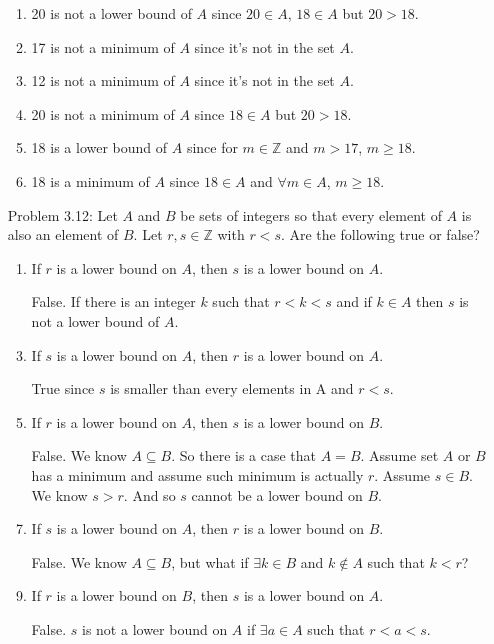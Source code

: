 \documentclass{article}
\theoremstyle{claim}
\theoremstyle{definition}
\begin{document}
\begin{enumerate}
\begin{enumerate}
            \item 20 is not a lower bound of $A$ since $20 \in A$, $18 \in A$ but $20 > 18$.
            \item 17 is not a minimum of $A$ since it's not in the set $A$.
            \item 12 is not a minimum of $A$ since it's not in the set $A$.
            \item 20 is not a minimum of $A$ since $18 \in A$ but $20 > 18$.
            \item 18 is a lower bound of $A$ since for $m \in \mathbb{Z}$ and $m > 17$, $m \ge 18$.
            \item 18 is a minimum of $A$ since $18 \in A$ and $\forall m \in A$, $m \ge 18$.
        \end{enumerate}

    \item[Problem 3.12:] Let $A$ and $B$ be sets of integers so that every element of $A$ is also an element of $B$. Let $r, s \in \mathbb{Z}$ with $r < s$. Are the following true or false?
        \begin{enumerate}
            \item If $r$ is a lower bound on $A$, then $s$ is a lower bound on $A$.
                \item[] False. If there is an integer $k$ such that $r < k < s$ and if $k \in A$ then $s$ is not a lower bound of $A$.
            \item If $s$ is a lower bound on $A$, then $r$ is a lower bound on $A$.
                \item[] True since $s$ is smaller than every elements in A and $r < s$.
            \item If $r$ is a lower bound on $A$, then $s$ is a lower bound on $B$.
                \item[] False. We know $A \subseteq B$. So there is a case that $A = B$. Assume set $A$ or $B$ has a minimum and assume such minimum is actually $r$. Assume $s \in B$. We know $s > r$. And so $s$ cannot be a lower bound on $B$.
            \item If $s$ is a lower bound on $A$, then $r$ is a lower bound on $B$.
                \item[] False. We know $A \subseteq B$, but what if $\exists k \in B$ and $k \notin A$ such that $k < r$?
            \item If $r$ is a lower bound on $B$, then $s$ is a lower bound on $A$.
                \item[] False. $s$ is not a lower bound on $A$ if $\exists a \in A$ such that $r < a < s$.

\end{enumerate}
\end{enumerate}
\end{document}

